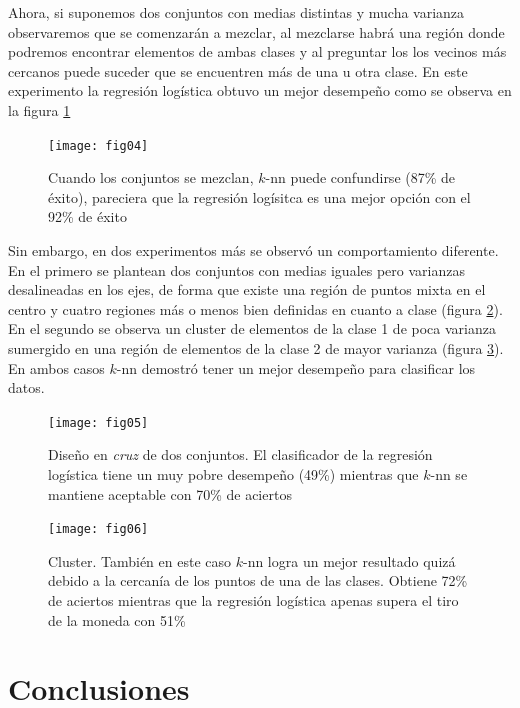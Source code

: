 \documentclass[11pt,letterpaper, reqno]{article}
\begin{document}
Ahora, si suponemos dos conjuntos con medias distintas y mucha varianza observaremos que se comenzarán a mezclar, al mezclarse habrá una región donde podremos encontrar elementos de ambas clases y al preguntar los los vecinos más cercanos puede suceder que se encuentren más de una u otra clase. En este experimento la regresión logística obtuvo un mejor desempeño como se observa en la figura \ref{fig:fig04}

\begin{figure}
	\label{fig:fig04}
	\begin{center}
		\texttt{[image: fig04]}
	\end{center}
	\caption{Cuando los conjuntos se mezclan, $k$-nn puede confundirse (87\% de éxito), pareciera que la regresión logísitca es una mejor opción con el 92\% de éxito}
\end{figure}

Sin embargo, en dos experimentos más se observó un comportamiento diferente. En el primero se plantean dos conjuntos con medias iguales pero varianzas desalineadas en los ejes, de forma que existe una región de puntos mixta en el centro y cuatro regiones más o menos bien definidas en cuanto a clase (figura \ref{fig:fig05}). En el segundo se observa un cluster de elementos de la clase 1 de poca varianza sumergido en una región de elementos de la clase 2 de mayor varianza (figura \ref{fig:fig06}). En ambos casos $k$-nn demostró tener un mejor desempeño para clasificar los datos.

\begin{figure}
	\label{fig:fig05}
	\begin{center}
		\texttt{[image: fig05]}
	\end{center}
	\caption{Diseño en \textit{cruz} de dos conjuntos. El clasificador de la regresión logística tiene un muy pobre desempeño (49\%) mientras que $k$-nn se mantiene aceptable con 70\% de aciertos}
\end{figure}

\begin{figure}
	\label{fig:fig06}
	\begin{center}
		\texttt{[image: fig06]}
	\end{center}
	\caption{Cluster. También en este caso $k$-nn logra un mejor resultado quizá debido a la cercanía de los puntos de una de las clases. Obtiene 72\% de aciertos mientras que la regresión logística apenas supera el tiro de la moneda con 51\%}
\end{figure}

\section{Conclusiones}
\end{document}
